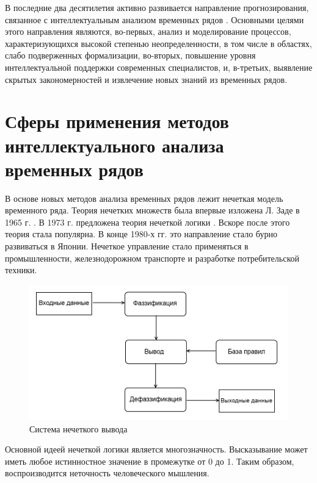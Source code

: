 В последние два десятилетия активно развивается направление прогнозирования, связанное с интеллектуальным анализом временных рядов \cite{Yarushkina2010}. 
Основными целями этого направления являются, во-первых, анализ и моделирование процессов, характеризующихся высокой степенью неопределенности, 
в том числе в областях, слабо подверженных формализации, 
во-вторых, повышение уровня интеллектуальной поддержки современных специалистов, 
и, в-третьих, выявление скрытых закономерностей и извлечение новых знаний из временных рядов. 

\section{Сферы применения методов интеллектуального анализа временных рядов}

В основе новых методов анализа временных рядов лежит нечеткая модель временного ряда. 
Теория нечетких множеств была впервые изложена Л. Заде в 1965 г. \cite{zadeh1965fuzzy}. 
В 1973 г. предложена теория нечеткой логики \cite{Zadeh1973}. 
Вскоре после этого теория стала популярна. 
В конце 1980-х гг. это направление стало бурно развиваться в Японии. 
Нечеткое управление стало применяться в промышленности, железнодорожном транспорте и разработке потребительской техники.

\begin{figure}[h]
    \centering
    \includegraphics[width=\textwidth, keepaspectratio]{images/fuzzy_engine.png}
    \caption{Система нечеткого вывода}
    \label{figure:fuzzy_engine}
\end{figure}

Основной идеей нечеткой логики является многозначность. 
Высказывание может иметь любое истинностное значение в промежутке от 0 до 1. 
Таким образом, воспроизводится неточность человеческого мышления.


